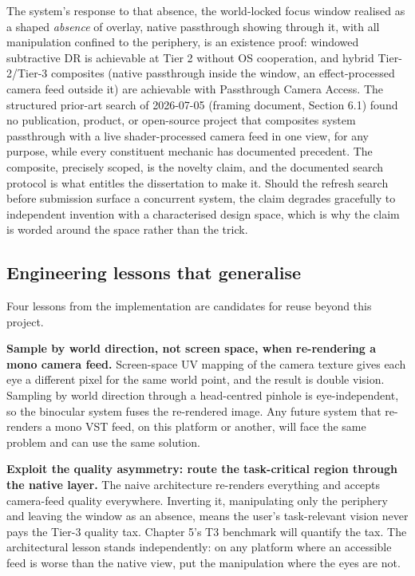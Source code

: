 The system's response to that absence, the world-locked focus window realised as a shaped \textit{absence}
of overlay, native passthrough showing through it, with all manipulation confined to the periphery,
is an existence proof: windowed subtractive DR is achievable at Tier 2 without OS cooperation, and
hybrid Tier-2/Tier-3 composites (native passthrough inside the window, an effect-processed camera
feed outside it) are achievable with Passthrough Camera Access. The structured prior-art search of
2026-07-05 (framing document, Section 6.1) found no publication, product, or open-source project
that composites system passthrough with a live shader-processed camera feed in one view, for any
purpose, while every constituent mechanic has documented precedent. The composite, precisely scoped,
is the novelty claim, and the documented search protocol is what entitles the dissertation to make
it. Should the refresh search before submission surface a concurrent system, the claim degrades
gracefully to independent invention with a characterised design space, which is why the claim is
worded around the space rather than the trick.

\subsection{Engineering lessons that generalise}

Four lessons from the implementation are candidates for reuse beyond this project.

\textbf{Sample by world direction, not screen space, when re-rendering a mono camera feed.}
Screen-space UV mapping of the camera texture gives each eye a different pixel for the same world
point, and the result is double vision. Sampling by world direction through a head-centred pinhole
is eye-independent, so the binocular system fuses the re-rendered image. Any future system that
re-renders a mono VST feed, on this platform or another, will face the same problem and can use
the same solution.

\textbf{Exploit the quality asymmetry: route the task-critical region through the native layer.} The
naive architecture re-renders everything and accepts camera-feed quality everywhere. Inverting it,
manipulating only the periphery and leaving the window as an absence, means the user's
task-relevant vision never pays the Tier-3 quality tax. Chapter 5's T3 benchmark will quantify the
tax. The architectural lesson stands independently: on any platform where an accessible feed is
worse than the native view, put the manipulation where the eyes are not.


